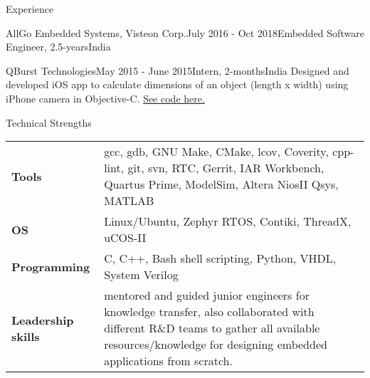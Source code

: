 \documentclass[
	a4paper, %
	11pt, %
]{resume} %
\begin{document}
\begin{rSection}{Experience}
\begin{rSubsection}{AllGo Embedded Systems, Visteon Corp.}{July 2016 - Oct 2018}{Embedded Software Engineer, 2.5-years}{India}
	\end{rSubsection}

	\begin{rSubsection}{QBurst Technologies}{May 2015 - June 2015}{Intern, 2-months}{India}
            Designed and developed iOS app to calculate dimensions of an object (length x width) using iPhone camera in Objective-C.
            \href{https://github.com/sebinsphilip/The\_Dimension\_Tool} {See code here.}

	\end{rSubsection}
 
\end{rSection}


\begin{rSection}{Technical Strengths}

	\begin{tabular}[t]{m{3cm} m{14cm}}
		\textbf{Tools} & gcc, gdb, GNU Make, CMake, lcov, Coverity, cpp-lint, git, svn, RTC, Gerrit, IAR
Workbench, Quartus Prime, ModelSim, Altera NiosII Qsys, MATLAB \\
            \textbf{OS} & Linux/Ubuntu, Zephyr RTOS, Contiki, ThreadX, uCOS-II \\
            \textbf{Programming} & C, C++, Bash shell scripting, Python, VHDL, System Verilog \\
		\textbf{Leadership skills} & mentored and guided junior engineers for knowledge transfer, also collaborated with different R\&D teams to gather all available resources/knowledge for designing embedded applications from scratch.

	\end{tabular}
 
\end{rSection}

\end{document}
